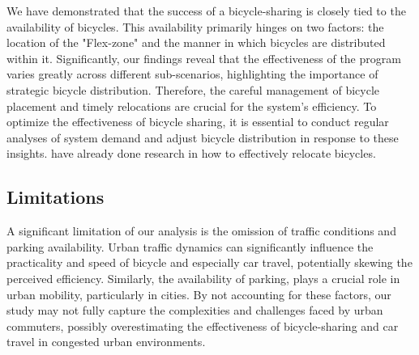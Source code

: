 We have demonstrated that the success of a bicycle-sharing is closely tied to the availability of bicycles.
This availability primarily hinges on two factors: the location of the "Flex-zone" and the manner in which bicycles are distributed within it.
Significantly, our findings reveal that the effectiveness of the program varies greatly across different sub-scenarios, highlighting the importance of strategic bicycle distribution.
Therefore, the careful management of bicycle placement and timely relocations are crucial for the system's efficiency.
To optimize the effectiveness of bicycle sharing, it is essential to conduct regular analyses of system demand and adjust bicycle distribution in response to these insights.
 have already done research in how to effectively relocate bicycles.




\subsection{Limitations}
\label{sec:limitations}



A significant limitation of our analysis is the omission of traffic conditions and parking availability. 
Urban traffic dynamics can significantly influence the practicality and speed of bicycle and especially car travel, potentially skewing the perceived efficiency.
Similarly, the availability of parking, plays a crucial role in urban mobility, particularly in cities.
By not accounting for these factors, our study may not fully capture the complexities and challenges faced by urban commuters, possibly overestimating the effectiveness of bicycle-sharing and car travel in congested urban environments.

